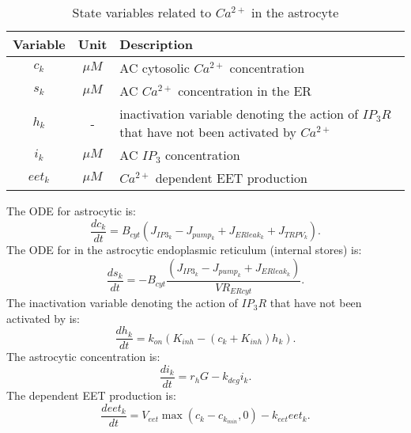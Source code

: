 			\begin{table}[h!]
				\small
				\centering
					\begin{tabular}{c c l}
				\hline
				Variable & Unit & Description \\
				\hline
				$c_k$ & $\mu M$ & AC cytosolic $Ca^{2+}$ concentration \\
				$s_k$ & $\mu M$ & AC $Ca^{2+}$ concentration in the ER \\
				$h_k$ & - & inactivation variable denoting the action of $IP_3R$ that have not been activated by $Ca^{2+}$ \\
				$i_k$ & $\mu M$ & AC $IP_3$ concentration \\
				$eet_k$ &  $\mu M$ & $Ca^{2+}$ dependent EET production \\
				\hline
					\end{tabular}
					\caption{State variables related to $Ca^{2+}$ in the astrocyte}
					\label{tab:NVU12ac}
			\end{table}
			
	The ODE for astrocytic \ca is:
	\begin{equation}
	\frac{d c_k}{dt} = B_{cyt} \left( J_{IP3_k} - J_{pump_k} + J_{ERleak_k} + J_{TRPV_k} \right). 
	\end{equation}	
	The ODE for \ca in the astrocytic endoplasmic reticulum (internal stores) is:
	\begin{equation}
	\frac{d s_k}{dt} = - B_{cyt} \frac{ \left( J_{IP3_k} - J_{pump_k} + J_{ERleak_k} \right)}{VR_{ERcyt}}. 
	\end{equation}
	The inactivation variable denoting the action of $IP_3R$ that have not been activated by \ca is:
	\begin{equation}
	\frac{d h_k}{dt} = k_{on} \left( K_{inh} - (c_k + K_{inh}) h_k \right).
	\end{equation}
	The astrocytic \ip concentration is:
	\begin{equation}
	\frac{d i_k}{dt} = r_h G - k_{deg} i_k.
	\end{equation}
	The \ca dependent EET production is:
	\begin{equation}
	\frac{d eet_k}{dt} = V_{eet} \max(c_k - c_{k_{min}}, 0) - k_{eet} eet_k.
	\end{equation}
	\\
	
